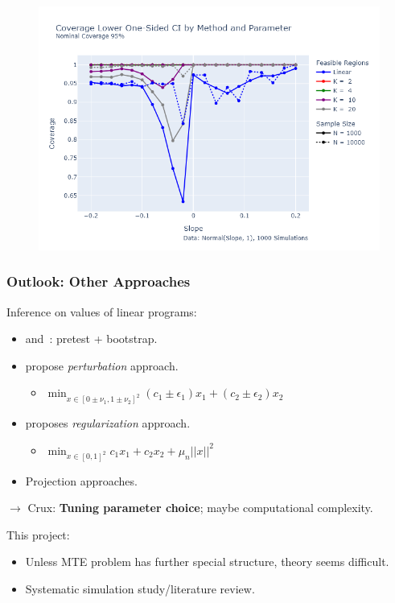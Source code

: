 \documentclass[11pt, aspectratio=169]{beamer}
\begin{document}
\begin{frame}
    \begin{figure}
        \includegraphics[height=0.9\textheight]{../figures/relax/covers_lower_one_sided_by_method.png}
    \end{figure}
\end{frame}

\begin{frame}
    \frametitle{Outlook: Other Approaches}
    Inference on values of linear programs:
    \begin{itemize}
        \item\citet{bhattacharya2009inferring} and~\citet{freyberger2015identification}: pretest + bootstrap.
        \item\citet{cho2024simple} propose \textit{perturbation} approach.
        \begin{itemize}
            \item $\min_{x\in[0\pm\nu_1,1\pm\nu_2]^2} (c_1 \pm \epsilon_1)x_1 + (c_2 \pm \epsilon_2)x_2$
        \end{itemize}
        \item\citet{gafarov2024simple} proposes \textit{regularization} approach.
        \begin{itemize}
            \item $\min_{x\in[0,1]^2} c_1x_1 + c_2x_2 + \mu_n||x||^2$
        \end{itemize}
        \item Projection approaches.
    \end{itemize}
    \pause
    $\rightarrow$ Crux: \textbf{Tuning parameter choice}; maybe computational complexity.

    \pause

    \vspace{0.5cm}
    This project:
    \begin{itemize}
        \item Unless MTE problem has further special structure, theory seems difficult.
        \item Systematic simulation study/literature review.
    \end{itemize}

\end{frame}


\end{document}
